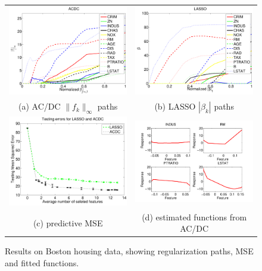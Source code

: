 \begin{figure}[t]
\begin{center}
\begin{tabular}{cc}
  \includegraphics[width=.38\textwidth]{figs/acdc_path}  &
  \includegraphics[width=.38\textwidth]{figs/lasso_path} 
\\
(a) AC/DC $\|f_k\|_\infty$ paths & 
(b) LASSO $|\beta_k|$ paths \\
  \includegraphics[width=.38\textwidth]{figs/MSEacdc} &
  \includegraphics[width=.45\textwidth]{figs/acdc_functs}
\\
(c) predictive MSE & (d) estimated functions from AC/DC
\end{tabular}
\end{center}
\caption{Results on Boston housing data, showing regularization paths,
 MSE and fitted functions.} \label{Boston}
\end{figure}


 

